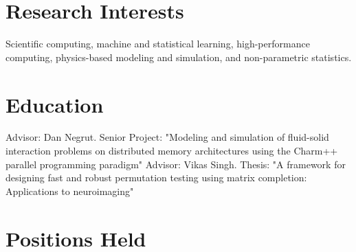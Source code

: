 \documentclass[11pt,a4paper,sans]{moderncv}        %
\begin{document}
\makecvtitle

\section{Research Interests}
Scientific computing, machine and statistical learning, high-performance computing, physics-based modeling and simulation, and non-parametric statistics.

\section{Education}
{}
{Advisor: Dan Negrut. Senior Project: "Modeling and simulation of fluid-solid interaction problems on distributed memory architectures using the Charm++ parallel programming paradigm"}  %
{Advisor: Vikas Singh. Thesis: "A framework for designing fast and robust permutation testing using matrix completion: Applications to neuroimaging"}


\section{Positions Held}
\end{document}
